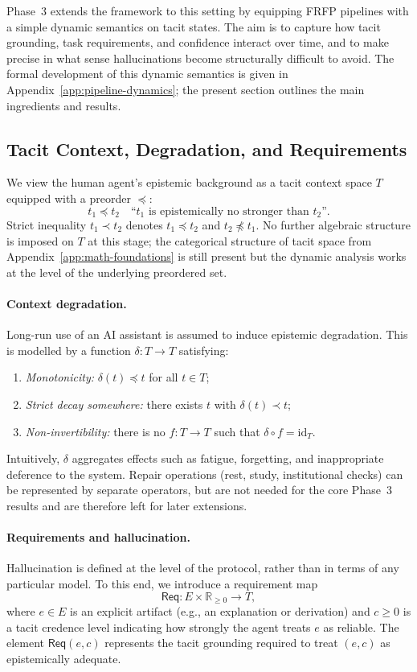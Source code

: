 \documentclass[11pt]{article}
\theoremstyle{definition}
\newcommand{\Req}{\mathsf{Req}}
\begin{document}
Phase~3 extends the framework to this setting by equipping FRFP
pipelines with a simple dynamic semantics on tacit states. The aim is
to capture how tacit grounding, task requirements, and confidence
interact over time, and to make precise in what sense hallucinations
become structurally difficult to avoid. The formal development of this
dynamic semantics is given in Appendix~\ref{app:pipeline-dynamics}; the
present section outlines the main ingredients and results.

\subsection{Tacit Context, Degradation, and Requirements}

We view the human agent's epistemic background as a tacit context space
\(T\) equipped with a preorder \(\preceq\):
\[
t_1 \preceq t_2
\quad\text{``\(t_1\) is epistemically no stronger than \(t_2\)''}.
\]
Strict inequality \(t_1 \prec t_2\) denotes \(t_1 \preceq t_2\) and
\(t_2 \not\preceq t_1\). No further algebraic structure is imposed on
\(T\) at this stage; the categorical structure of tacit space from
Appendix~\ref{app:math-foundations} is still present but the dynamic
analysis works at the level of the underlying preordered set.

\paragraph{Context degradation.}
Long-run use of an AI assistant is assumed to induce epistemic
degradation. This is modelled by a function \(\delta:T\to T\) satisfying:
\begin{enumerate}[label=(D\arabic*),leftmargin=2.2em]
  \item \emph{Monotonicity:} \(\delta(t) \preceq t\) for all \(t\in T\);
  \item \emph{Strict decay somewhere:} there exists \(t\) with
        \(\delta(t) \prec t\);
  \item \emph{Non-invertibility:} there is no \(f:T\to T\) such that
        \(\delta\circ f = \mathrm{id}_T\).
\end{enumerate}
Intuitively, \(\delta\) aggregates effects such as fatigue, forgetting,
and inappropriate deference to the system. Repair operations (rest,
study, institutional checks) can be represented by separate operators,
but are not needed for the core Phase~3 results and are therefore left
for later extensions.

\paragraph{Requirements and hallucination.}
Hallucination is defined at the level of the protocol, rather than in
terms of any particular model. To this end, we introduce a requirement
map
\[
\Req : E \times \mathbb{R}_{\ge 0} \to T,
\]
where \(e\in E\) is an explicit artifact (e.g., an explanation or
derivation) and \(c\ge 0\) is a tacit credence level indicating how
strongly the agent treats \(e\) as reliable. The element \(\Req(e,c)\)
represents the tacit grounding required to treat \((e,c)\) as
epistemically adequate.
\end{document}
